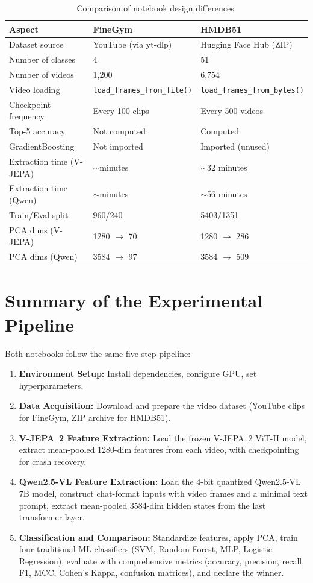 \documentclass[a4paper, 12pt]{article}
\begin{document}
\begin{table}[H]
\centering
\begin{tabular}{p{4.5cm} p{4.5cm} p{4.5cm}}
\toprule
\textbf{Aspect} & \textbf{FineGym} & \textbf{HMDB51} \\
\midrule
Dataset source & YouTube (via yt-dlp) & Hugging Face Hub (ZIP) \\
Number of classes & 4 & 51 \\
Number of videos & 1,200 & 6,754 \\
Video loading & \texttt{load\_frames\_from\_file()} & \texttt{load\_frames\_from\_bytes()} \\
Checkpoint frequency & Every 100 clips & Every 500 videos \\
Top-5 accuracy & Not computed & Computed \\
GradientBoosting & Not imported & Imported (unused) \\
Extraction time (V-JEPA) & $\sim$minutes & $\sim$32 minutes \\
Extraction time (Qwen) & $\sim$minutes & $\sim$56 minutes \\
Train/Eval split & 960/240 & 5403/1351 \\
PCA dims (V-JEPA) & 1280 $\to$ 70 & 1280 $\to$ 286 \\
PCA dims (Qwen) & 3584 $\to$ 97 & 3584 $\to$ 509 \\
\bottomrule
\end{tabular}
\caption{Comparison of notebook design differences.}
\end{table}

\section{Summary of the Experimental Pipeline}

Both notebooks follow the same five-step pipeline:

\begin{enumerate}
  \item \textbf{Environment Setup:} Install dependencies, configure GPU, set hyperparameters.
  \item \textbf{Data Acquisition:} Download and prepare the video dataset (YouTube clips for FineGym, ZIP archive for HMDB51).
  \item \textbf{V-JEPA~2 Feature Extraction:} Load the frozen V-JEPA~2 ViT-H model, extract mean-pooled 1280-dim features from each video, with checkpointing for crash recovery.
  \item \textbf{Qwen2.5-VL Feature Extraction:} Load the 4-bit quantized Qwen2.5-VL 7B model, construct chat-format inputs with video frames and a minimal text prompt, extract mean-pooled 3584-dim hidden states from the last transformer layer.
  \item \textbf{Classification and Comparison:} Standardize features, apply PCA, train four traditional ML classifiers (SVM, Random Forest, MLP, Logistic Regression), evaluate with comprehensive metrics (accuracy, precision, recall, F1, MCC, Cohen's Kappa, confusion matrices), and declare the winner.
\end{enumerate}
\end{document}
